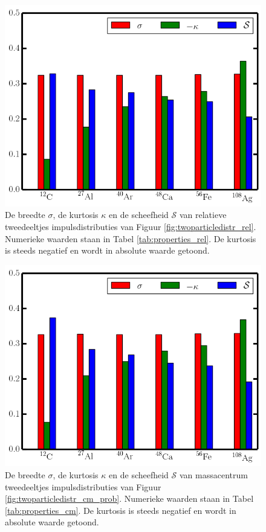 \documentclass[11pt,twoside]{book}
\begin{document}
\begin{figure} 
\centering
\includegraphics[scale=0.45]{./figuren/properties_rel.png}
\caption{De breedte $\sigma$, de kurtosis $\kappa$ en de scheefheid $\mathcal{S}$ van relatieve tweedeeltjes impulsdistributies van Figuur \ref{fig:twoparticledistr_rel}. Numerieke waarden staan in Tabel \ref{tab:properties_rel}. De kurtosis is steeds negatief en wordt in absolute waarde getoond.}
\label{fig:properties_rel}
\end{figure}
\begin{figure}
\centering
\includegraphics[scale=0.45]{./figuren/properties_cm.png}
\caption{De breedte $\sigma$, de kurtosis $\kappa$ en de scheefheid $\mathcal{S}$ van massacentrum tweedeeltjes impulsdistributies van Figuur \ref{fig:twoparticledistr_cm_prob}. Numerieke waarden staan in Tabel \ref{tab:properties_cm}. De kurtosis is steeds negatief en wordt in absolute waarde getoond.}
\label{fig:properties_cm}
\end{figure}
\end{document}
